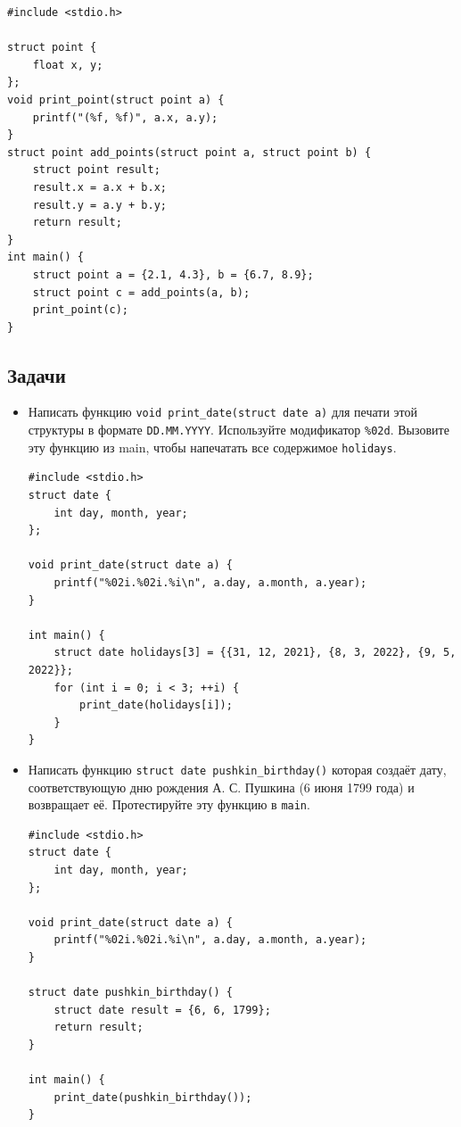 \documentclass{article}
\begin{document}
\begin{lstlisting}
#include <stdio.h>

struct point {
    float x, y;
};
void print_point(struct point a) {
    printf("(%f, %f)", a.x, a.y);
}
struct point add_points(struct point a, struct point b) {
    struct point result;
    result.x = a.x + b.x;
    result.y = a.y + b.y;
    return result;
}
int main() {
    struct point a = {2.1, 4.3}, b = {6.7, 8.9};
    struct point c = add_points(a, b);
    print_point(c);
}
\end{lstlisting}

\subsection*{Задачи}
\begin{itemize}
\item Написать функцию \texttt{void print\_date(struct date a)} для печати этой структуры в формате \texttt{DD.MM.YYYY}. Используйте модификатор \texttt{\%02d}. Вызовите эту функцию из main, чтобы напечатать все содержимое \texttt{holidays}.

\begin{lstlisting}[backgroundcolor = \color{solcolor}]
#include <stdio.h>
struct date {
    int day, month, year;
};

void print_date(struct date a) {
    printf("%02i.%02i.%i\n", a.day, a.month, a.year);
}

int main() {
    struct date holidays[3] = {{31, 12, 2021}, {8, 3, 2022}, {9, 5, 2022}};
    for (int i = 0; i < 3; ++i) {
        print_date(holidays[i]);
    }
}
\end{lstlisting}

\newpage
\item Написать функцию \texttt{struct date pushkin\_birthday()} которая создаёт дату, соответствующую дню рождения А. С. Пушкина (6 июня 1799 года) и возвращает её. Протестируйте эту функцию в \texttt{main}.
\begin{lstlisting}[backgroundcolor = \color{solcolor}]
#include <stdio.h>
struct date {
    int day, month, year;
};

void print_date(struct date a) {
    printf("%02i.%02i.%i\n", a.day, a.month, a.year);
}

struct date pushkin_birthday() {
    struct date result = {6, 6, 1799};
    return result;
}

int main() {
    print_date(pushkin_birthday());
}
\end{lstlisting}


\end{itemize}
\end{document}
